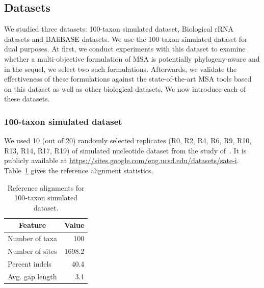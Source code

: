 \subsection{Datasets}
We studied three datasets: 100-taxon simulated dataset, Biological rRNA datasets and BAliBASE datasets. We use the 100-taxon simulated dataset for dual purposes. At first, we conduct experiments with this dataset to examine whether a multi-objective formulation of MSA is potentially phylogeny-aware and in the sequel, we select two such formulations. Afterwards, we validate the effectiveness of these formulations against the state-of-the-art MSA tools based on this dataset as well as other biological datasets. We now introduce each of these datasets.

\subsubsection{100-taxon simulated dataset}
We used 10 (out of 20) randomly selected replicates (R0, R2, R4, R6, R9, R10, R13, R14, R17, R19) of simulated nucleotide dataset from the study of~\citealp{liu2009rapid}. It is publicly available at \url{https://sites.google.com/eng.ucsd.edu/datasets/sate-i}. Table~\ref{tab:sim_stat} gives the reference alignment statistics.

\begin{table}[htbp]
	\centering
	\caption{Reference alignments for 100-taxon simulated dataset.}
	   \begin{tabular}{|l|r|}
		\hline
		\multicolumn{1}{|c|}{Feature} & \multicolumn{1}{c|}{Value} \\
		\hline
		Number of taxa & 100 \\
		\hline
		Number of sites & 1698.2 \\
		\hline
		Percent indels & 40.4 \\
		\hline
		Avg. gap length & 3.1 \\
		\hline
		\end{tabular}%
	\label{tab:sim_stat}%
\end{table}%


